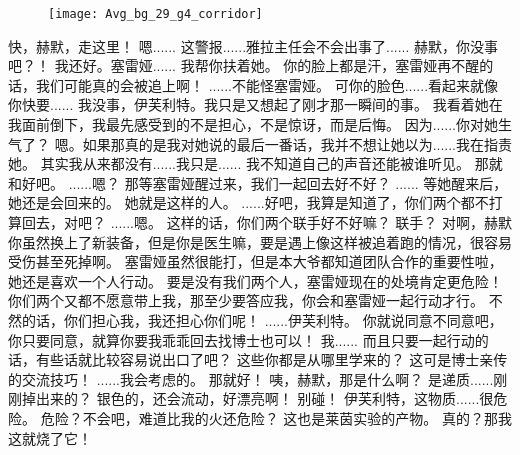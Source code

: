 \documentclass[openany]{book}
\begin{document}
\begin{figure}[h]
    \centering
    \texttt{[image: Avg\_bg\_29\_g4\_corridor]}
\end{figure}
\begin{dialogue}
     快，赫默，走这里！
     嗯......
     这警报......雅拉主任会不会出事了......
     赫默，你没事吧？！
     我还好。塞雷娅......
     我帮你扶着她。
     你的脸上都是汗，塞雷娅再不醒的话，我们可能真的会被追上啊！
     ......不能怪塞雷娅。
     可你的脸色......看起来就像你快要......
     我没事，伊芙利特。我只是又想起了刚才那一瞬间的事。
     我看着她在我面前倒下，我最先感受到的不是担心，不是惊讶，而是后悔。
     因为......你对她生气了？
     嗯。如果那真的是我对她说的最后一番话，我并不想让她以为......我在指责她。
     其实我从来都没有......我只是......
     我不知道自己的声音还能被谁听见。
     那就和好吧。
     ......嗯？
     那等塞雷娅醒过来，我们一起回去好不好？
     ......
     等她醒来后，她还是会回来的。
     她就是这样的人。
     ......好吧，我算是知道了，你们两个都不打算回去，对吧？
     ......嗯。
     这样的话，你们两个联手好不好嘛？
     联手？
     对啊，赫默你虽然换上了新装备，但是你是医生嘛，要是遇上像这样被追着跑的情况，很容易受伤甚至死掉啊。
     塞雷娅虽然很能打，但是本大爷都知道团队合作的重要性啦，她还是喜欢一个人行动。
     要是没有我们两个人，塞雷娅现在的处境肯定更危险！
     你们两个又都不愿意带上我，那至少要答应我，你会和塞雷娅一起行动才行。
     不然的话，你们担心我，我还担心你们呢！
     ......伊芙利特。
     你就说同意不同意吧，你只要同意，就算你要我乖乖回去找博士也可以！
     我......
     而且只要一起行动的话，有些话就比较容易说出口了吧？
     这些你都是从哪里学来的？
     这可是博士亲传的交流技巧！
     ......我会考虑的。
     那就好！
     咦，赫默，那是什么啊？
     是递质......刚刚掉出来的？
     银色的，还会流动，好漂亮啊！
     别碰！
     伊芙利特，这物质......很危险。
     危险？不会吧，难道比我的火还危险？
     这也是莱茵实验的产物。
     真的？那我这就烧了它！

\end{dialogue}
\end{document}
